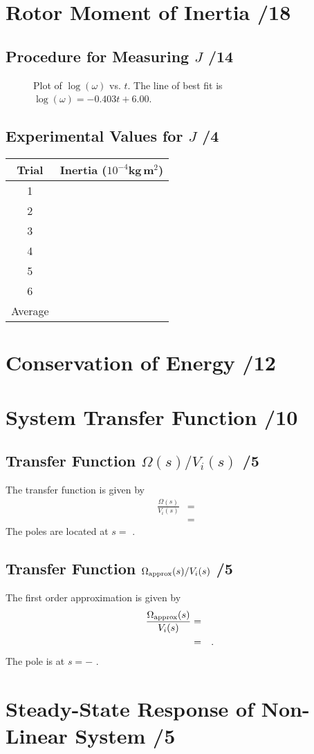\documentclass{article}
\newcommand{\score}{\hfill \underline{\hspace{1cm}}/}
\begin{document}
\section{Rotor Moment of Inertia \score 18}
\subsection{Procedure for Measuring $J$ \score 14}

\begin{figure}[htbp]
\centering
\caption{Plot of $\log(\omega)$ vs. $t$.  The line of best fit is $\log(\omega) = -0.403t + 6.00$. }
\label{fig:iner_plot}
\end{figure}


\subsection{Experimental Values for $J$ \score 4}
\begin{center}
\begin{tabular}{cr}
Trial & Inertia ($10^{-4}$kg\,m$^2$) \\
\hline
1 &  \\
2 &  \\
3 &  \\
4 &  \\
5 &  \\
6 &  \\
Average & 
\end{tabular}
\end{center}

\section{Conservation of Energy \score 12}


\section{System Transfer Function \score 10}
\subsection{Transfer Function $\Omega(s)/V_i(s)$ \score 5}
The transfer function is given by
\begin{eqnarray*}
\frac{\Omega(s)}{V_i(s)} &=& \\
&=& 
\end{eqnarray*}
The poles are located at $s = $ .

\subsection{Transfer Function $\Omega_{\rm approx}(s)/V_i(s)$ \score 5}
The first order approximation is given by
\begin{eqnarray*}
\frac{\Omega_{\rm approx}(s)}{V_i(s)} &=& \\
&=&.
\end{eqnarray*}
The pole is at $s=-$ .
\section{Steady-State Response of Non-Linear System \score 5}
\end{document}

